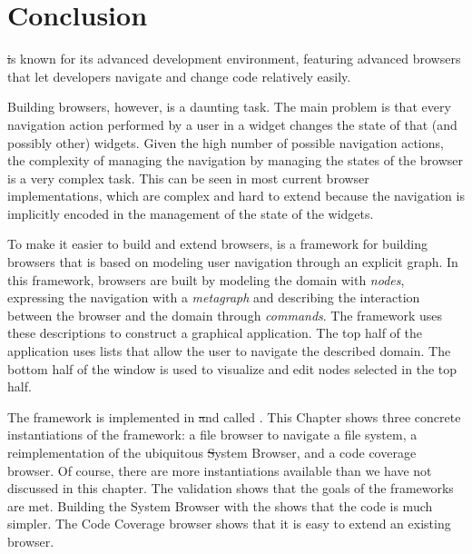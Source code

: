 \documentclass[a4paper,10pt,twoside]{book}
\begin{document}
\section{Conclusion} 



\st is known for its advanced development environment, featuring advanced browsers that let developers navigate and change code relatively easily.


Building browsers, however, is a daunting task. The main problem is that every navigation action performed by a user in a widget changes the state of that (and possibly other) widgets. Given the high number of possible navigation actions, the complexity of managing the navigation by managing the states of the browser is a very complex task.
This can be seen in most current browser implementations, which are complex and hard to extend because the navigation is implicitly encoded in the management of the state of the widgets.
 

To make it easier to build and extend browsers, \ob is a framework for building browsers that is based on modeling user navigation through an explicit graph.
In this framework, browsers are built by modeling the domain with \emph{nodes}, expressing the navigation with a \emph{metagraph} and describing the interaction between the browser and the domain through \emph{commands}. 
The framework uses these descriptions to construct a graphical application. The top half of the application uses lists that allow the user to navigate the described domain. The bottom half of the window is used to visualize and edit nodes selected in the top half.

The framework is implemented in \pharo \st and called \ob.
This Chapter shows three concrete instantiations of the framework: a file browser to navigate a file system, a reimplementation of the ubiquitous \st System Browser, and a code coverage browser.
Of course, there are more instantiations available than we have not discussed in this chapter.
The validation shows that the goals of the frameworks are met. Building the System Browser with the \obf shows that the code is much simpler. The Code Coverage browser shows that it is easy to extend an existing browser.
\end{document}
